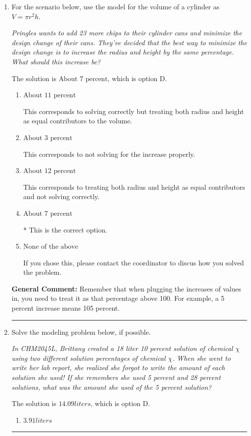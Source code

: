 \documentclass{extbook}[14pt]
\newcommand{\litem}[1]{\item #1

\rule{\textwidth}{0.4pt}}
\begin{document}
\begin{enumerate}\litem{
For the scenario below, use the model for the volume of a cylinder as $V = \pi r^2 h$.

\begin{center}
    \textit{ Pringles wants to add 23 \text{percent} more chips to their cylinder cans and minimize the design change of their cans. They've decided that the best way to minimize the design change is to increase the radius and height by the same percentage. What should this increase be? }
\end{center}
The solution is \( \text{About } 7 \text{ percent} \), which is option D.\begin{enumerate}[label=\Alph*.]
\item \( \text{About } 11 \text{ percent} \)

This corresponds to solving correctly but treating both radius and height as equal contributors to the volume.
\item \( \text{About } 3 \text{ percent} \)

This corresponds to not solving for the increase properly.
\item \( \text{About } 12 \text{ percent} \)

This corresponds to treating both radius and height as equal contributors and not solving correctly.
\item \( \text{About } 7 \text{ percent} \)

* This is the correct option.
\item \( \text{None of the above} \)

If you chose this, please contact the coordinator to discus how you solved the problem.
\end{enumerate}

\textbf{General Comment:} Remember that when plugging the increases of values in, you need to treat it as that percentage above 100. For example, a 5 percent increase means 105 percent.
}
\litem{
Solve the modeling problem below, if possible.

\begin{center}
    \textit{ In CHM2045L, Brittany created a 18 liter 10 percent solution of chemical $\chi$ using two different solution percentages of chemical $\chi$. When she went to write her lab report, she realized she forgot to write the amount of each solution she used! If she remembers she used 5 percent and 28 percent solutions, what was the amount she used of the 5 percent solution? }
\end{center}
The solution is \( 14.09 liters \), which is option D.\begin{enumerate}[label=\Alph*.]
\item \( 3.91 liters \)


\end{enumerate}}
\end{enumerate}
\end{document}
